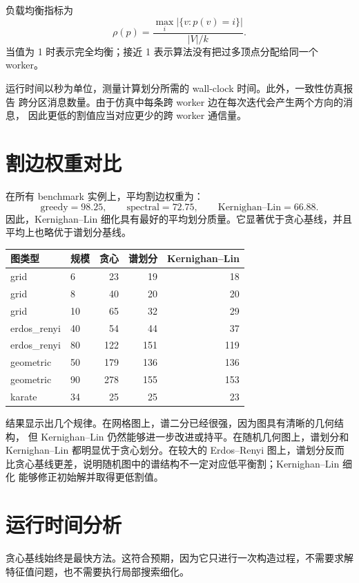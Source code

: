 \documentclass[UTF8, 11pt]{ctexart}
\begin{document}
负载均衡指标为
\[
    \rho(p)=
    \frac{\max_i |\{v:p(v)=i\}|}{|V|/k}.
\]
当值为 1 时表示完全均衡；接近 1 表示算法没有把过多顶点分配给同一个 worker。

运行时间以秒为单位，测量计算划分所需的 wall-clock 时间。此外，一致性仿真报告
跨分区消息数量。由于仿真中每条跨 worker 边在每次迭代会产生两个方向的消息，
因此更低的割值应当对应更少的跨 worker 通信量。

\section{割边权重对比}

在所有 benchmark 实例上，平均割边权重为：
\[
    \text{greedy}=98.25,\qquad
    \text{spectral}=72.75,\qquad
    \text{Kernighan--Lin}=66.88.
\]
因此，Kernighan--Lin 细化具有最好的平均划分质量。它显著优于贪心基线，并且
平均上也略优于谱划分基线。

\begin{center}
\begin{tabular}{llrrr}
\toprule
图类型 & 规模 & 贪心 & 谱划分 & Kernighan--Lin \\
\midrule
grid & 6 & 23 & 19 & 18 \\
grid & 8 & 40 & 20 & 20 \\
grid & 10 & 65 & 32 & 29 \\
erdos\_renyi & 40 & 54 & 44 & 37 \\
erdos\_renyi & 80 & 122 & 151 & 119 \\
geometric & 50 & 179 & 136 & 136 \\
geometric & 90 & 278 & 155 & 153 \\
karate & 34 & 25 & 25 & 23 \\
\bottomrule
\end{tabular}
\end{center}

结果显示出几个规律。在网格图上，谱二分已经很强，因为图具有清晰的几何结构，
但 Kernighan--Lin 仍然能够进一步改进或持平。在随机几何图上，谱划分和
Kernighan--Lin 都明显优于贪心划分。在较大的 Erdos--Renyi 图上，谱划分反而
比贪心基线更差，说明随机图中的谱结构不一定对应低平衡割；Kernighan--Lin 细化
能够修正初始解并取得更低割值。

\section{运行时间分析}

贪心基线始终是最快方法。这符合预期，因为它只进行一次构造过程，不需要求解
特征值问题，也不需要执行局部搜索细化。
\end{document}
